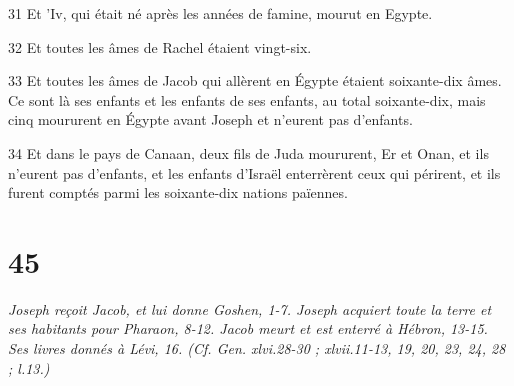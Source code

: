\par 31 Et 'Iv, qui était né après les années de famine, mourut en Egypte.
\par 32 Et toutes les âmes de Rachel étaient vingt-six.
\par 33 Et toutes les âmes de Jacob qui allèrent en Égypte étaient soixante-dix âmes. Ce sont là ses enfants et les enfants de ses enfants, au total soixante-dix, mais cinq moururent en Égypte avant Joseph et n'eurent pas d'enfants.
\par 34 Et dans le pays de Canaan, deux fils de Juda moururent, Er et Onan, et ils n'eurent pas d'enfants, et les enfants d'Israël enterrèrent ceux qui périrent, et ils furent comptés parmi les soixante-dix nations païennes.

\chapter{45}

\par \textit{Joseph reçoit Jacob, et lui donne Goshen, 1-7. Joseph acquiert toute la terre et ses habitants pour Pharaon, 8-12. Jacob meurt et est enterré à Hébron, 13-15. Ses livres donnés à Lévi, 16. (Cf. Gen. xlvi.28-30 ; xlvii.11-13, 19, 20, 23, 24, 28 ; l.13.)}

